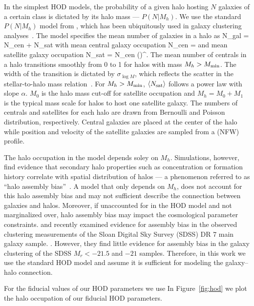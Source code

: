 In the simplest HOD models, the probability of a given halo hosting $N$ galaxies 
of a certain class is dictated by its halo mass --- $P(N|M_h)$.%
We use the standard $P(N|M_h)$ model from \cite{zheng2007}, which has been 
ubiquitously used in galaxy clustering analyses~\citep[\emph{e.g.}][]{sinha2018}. 
The model specifies the mean number of galaxies in a halo as
\beq
\langle N_{\rm gal} \rangle = \langle N_{\rm cen} \rangle + \langle N_{\rm sat} \rangle
\eeq
with mean central galaxy occupation
\beq \label{eq:Ncen}
\langle N_{\rm cen} \rangle  = 
\eeq
and mean satellite galaxy occupation
\beq \label{eq:Nsat}
\langle N_{\rm sat} \rangle = \langle N_{\rm cen} \rangle \bigg(\bigg)^\alpha.
\eeq
The mean number of centrals in a halo transitions smoothly from 0 to 1 for halos 
with mass $M_h > M_{\rm min}$. The width of the transition is dictated by 
$\sigma_{\log M}$, which reflects the scatter in the stellar-to-halo mass 
relation~\citep[SHMR][]{citecite}. For $M_h > M_{\rm min}$, 
$\langle N_{\rm sat} \rangle$ follows a power law with slope $\alpha$. $M_0$ 
is the halo mass cut-off for satellite occupation and $M_h = M_0 + M_1$ is 
the typical mass scale for halos to host one satellite galaxy. The numbers 
of centrals and satellites for each halo are drawn from Bernoulli and Poisson 
distribution, respectively. Central galaxies are placed at the center of the
halo while position and velocity of the satellite galaxies are sampled from a 
\cite{navarro1997} (NFW) profile. 

The halo occupation in the \cite{zheng2007} model depends soley on $M_h$. 
Simulations, however, find evidence that secondary halo properties such as
concentration or formation history correlate with spatial distribution of
halos --- a phenomenon referred to as ``halo assembly bias''~\citep{sheth2004, gao2005, harker2006, wechsler2006}.
A model that only depends on $M_h$, does not account for this halo assembly 
bias and may not sufficient describe the connection between galaxies and 
halos. Moreover, if unaccounted for in the HOD model and not marginalized 
over, halo assembly bias may impact the cosmological parameter constraints. 
\cite{zentner2016} and \cite{vakili2019} recently examined evidence for 
assembly bias in the observed clustering measurements of the Sloan Digital 
Sky Survey (SDSS) DR 7 main galaxy sample. . 
However, they find little evidence for assembly bias in the galaxy clustering
of the SDSS $M_r < -21.5$  and $-21$ samples. Therefore, in this work we use 
the standard \cite{zheng2007} HOD model and assume it is sufficient for modeling 
the galaxy--halo connection. 

For the fiducial values of our HOD parameters we use  
In Figure~\ref{fig:hod} we plot the halo occupation of our fiducial 
HOD parameters. 

